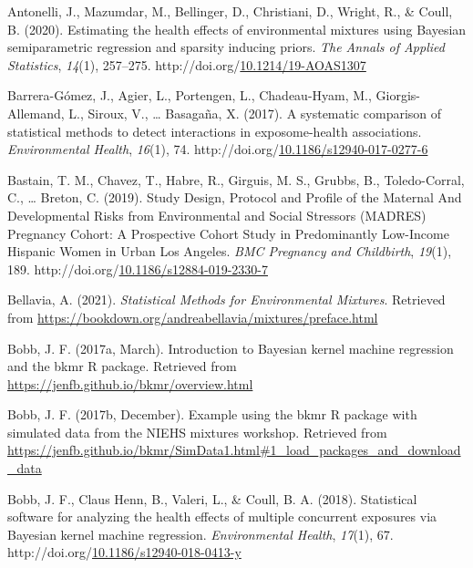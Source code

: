 \documentclass[12pt, twoside]{amherstthesis}
\newenvironment{CSLReferences}[2]%
  {}%
  {\par}
\begin{document}
\hypertarget{refs}{}
\begin{CSLReferences}{1}{0}
\leavevmode{}%
Antonelli, J., Mazumdar, M., Bellinger, D., Christiani, D., Wright, R., \& Coull, B. (2020). Estimating the health effects of environmental mixtures using {Bayesian} semiparametric regression and sparsity inducing priors. \emph{The Annals of Applied Statistics}, \emph{14}(1), 257--275. http://doi.org/\href{https://doi.org/10.1214/19-AOAS1307}{10.1214/19-AOAS1307}

\leavevmode{}%
Barrera-Gómez, J., Agier, L., Portengen, L., Chadeau-Hyam, M., Giorgis-Allemand, L., Siroux, V., \ldots{} Basagaña, X. (2017). A systematic comparison of statistical methods to detect interactions in exposome-health associations. \emph{Environmental Health}, \emph{16}(1), 74. http://doi.org/\href{https://doi.org/10.1186/s12940-017-0277-6}{10.1186/s12940-017-0277-6}

\leavevmode{}%
Bastain, T. M., Chavez, T., Habre, R., Girguis, M. S., Grubbs, B., Toledo-Corral, C., \ldots{} Breton, C. (2019). Study {Design}, {Protocol} and {Profile} of the {Maternal} {And} {Developmental} {Risks} from {Environmental} and {Social} {Stressors} ({MADRES}) {Pregnancy} {Cohort}: A {Prospective} {Cohort} {Study} in {Predominantly} {Low}-{Income} {Hispanic} {Women} in {Urban} {Los} {Angeles}. \emph{BMC Pregnancy and Childbirth}, \emph{19}(1), 189. http://doi.org/\href{https://doi.org/10.1186/s12884-019-2330-7}{10.1186/s12884-019-2330-7}

\leavevmode{}%
Bellavia, A. (2021). \emph{Statistical {Methods} for {Environmental} {Mixtures}}. Retrieved from \url{https://bookdown.org/andreabellavia/mixtures/preface.html}

\leavevmode{}%
Bobb, J. F. (2017a, March). Introduction to {Bayesian} kernel machine regression and the bkmr {R} package. Retrieved from \url{https://jenfb.github.io/bkmr/overview.html}

\leavevmode{}%
Bobb, J. F. (2017b, December). Example using the bkmr {R} package with simulated data from the {NIEHS} mixtures workshop. Retrieved from \url{https://jenfb.github.io/bkmr/SimData1.html\#1_load_packages_and_download_data}

\leavevmode{}%
Bobb, J. F., Claus Henn, B., Valeri, L., \& Coull, B. A. (2018). Statistical software for analyzing the health effects of multiple concurrent exposures via {Bayesian} kernel machine regression. \emph{Environmental Health}, \emph{17}(1), 67. http://doi.org/\href{https://doi.org/10.1186/s12940-018-0413-y}{10.1186/s12940-018-0413-y}


\end{CSLReferences}
\end{document}
